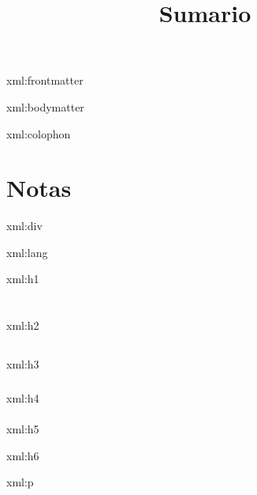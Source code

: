 \startxmlsetups xml:frontmatter
    \title{Sumario}\placelist[chapter]
    \stopfirstmatter

    \startfrontmatter
\stopxmlsetups

\startxmlsetups xml:bodymatter
    \stopfrontmatter

    \startbodymatter
\stopxmlsetups

\startxmlsetups xml:colophon
    \stopbodymatter
    \startmode[notasalpie]
    \startbackmatter
    \chapter{Notas}

    \placefootnotes
    \stopbackmatter
    \stopmode

    \startcolophonmakeup
    \stopcolophonmakeup
\stopxmlsetups

\startxmlsetups xml:div
\stopxmlsetups

\startxmlsetups xml:lang
     \begingroup
     \endgroup
\stopxmlsetups

\startxmlsetups xml:h1
    \chapter{}
\stopxmlsetups

\startxmlsetups xml:h2
    \section{}
\stopxmlsetups

\startxmlsetups xml:h3
    \subsection{}
\stopxmlsetups

\startxmlsetups xml:h4
    \subsubsection{}
\stopxmlsetups

\startxmlsetups xml:h5
\stopxmlsetups

\startxmlsetups xml:h6
\stopxmlsetups

\startxmlsetups xml:p
     {
        \dontleavehmode
        \ignorespaces
        \removeunwantedspaces
    }
    \par
\stopxmlsetups

